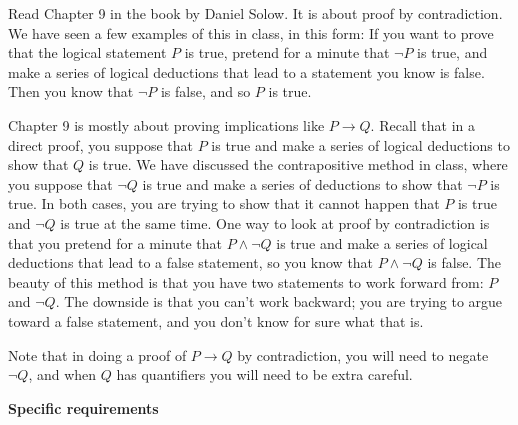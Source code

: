 
Read Chapter 9 in the book by Daniel Solow.
It is about proof by contradiction.
We have seen a few examples of this in class, in this form:  If you want to prove that the logical statement $P$ is true, pretend for a minute that $\lnot P$ is true, and make a series of logical deductions that lead to a statement you know is false.  Then you know that $\lnot P$ is false, and so $P$ is true.

Chapter 9 is mostly about proving implications like $P \to Q$.
Recall that in a direct proof, you suppose that $P$ is true and make a series of logical deductions to show that $Q$ is true.
We have discussed the contrapositive method in class, where you suppose that $\lnot Q$ is true and make a series of deductions to show that $\lnot P$ is true.  
In both cases, you are trying to show that it cannot happen that $P$ is true and $\lnot Q$ is true at the same time.
One way to look at proof by contradiction is that you pretend for a minute that $P \wedge \lnot Q$ is true and make a series of logical deductions that lead to a false statement, so you know that $P \wedge \lnot Q$ is false.
The beauty of this method is that you have two statements to work forward from: $P$ and $\lnot Q$.
The downside is that you can't work backward; you are trying to argue toward a false statement, and you don't know for sure what that is.

Note that in doing a proof of $P \to Q$ by contradiction, you will need to negate $\lnot Q$, and when $Q$ has quantifiers you will need to be extra careful.

\vspace{0.1in}
\noindent
{\bf Specific requirements}
\vspace*{-0.15in}

